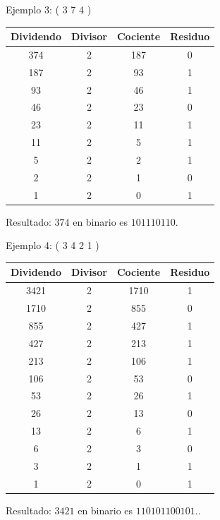 \documentclass{IEEEcsmag}
\begin{document}
Ejemplo 3: ( 3 7 4 )  \newline
\newline \begin{tabular}{|c|c|c|c|}
  \hline
  Dividendo & Divisor & Cociente & Residuo \\
  \hline
  374 & 2 & 187 & 0 \\
  187 & 2 & 93 & 1 \\
  93 & 2 & 46 & 1 \\
  46 & 2 & 23 & 0 \\
  23 & 2 & 11 & 1 \\
  11 & 2 & 5 & 1 \\
  5 & 2 & 2 & 1 \\
  2 & 2 & 1 & 0 \\
  1 & 2 & 0 & 1 \\
  \hline
\end{tabular}
\newline

Resultado: \(374\) en binario es \(101110110\).
\newline


Ejemplo 4: ( 3 4 2 1 ) \newline 
\newline \begin{tabular}{|c|c|c|c|}
  \hline
  Dividendo & Divisor & Cociente & Residuo \\
  \hline
  3421 & 2 & 1710 & 1 \\
  1710 & 2 & 855 & 0 \\
  855 & 2 & 427 & 1 \\
  427 & 2 & 213 & 1 \\
  213 & 2 & 106 & 1 \\
  106 & 2 & 53 & 0 \\
  53 & 2 & 26 & 1 \\
  26 & 2 & 13 & 0 \\
  13 & 2 & 6 & 1 \\
  6 & 2 & 3 & 0 \\
  3 & 2 & 1 & 1 \\
  1 & 2 & 0 & 1 \\
  \hline
\end{tabular}
\newline

Resultado: \(3421\) en binario es \( 110101100101.\).
\clearpage










\end{document}
